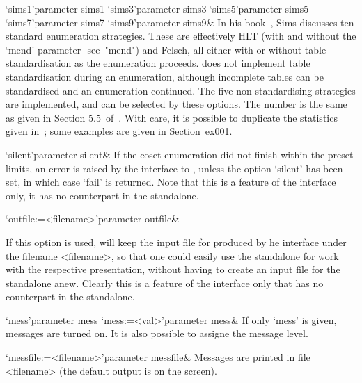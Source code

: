 \>`sims1'{parameter sims1}
\>`sims3'{parameter sims3}
\>`sims5'{parameter sims5}
\>`sims7'{parameter sims7}
\>`sims9'{parameter sims9}&
In  his  book~\cite{Sim},  Sims discusses  ten  standard  enumeration
strategies.  These  are effectively HLT  (with and without  the `mend'
parameter -see~"mend")  and Felsch, all  either with or  without table
standardisation as the enumeration proceeds.
{\ACE} does not implement table standardisation during an enumeration,
although  incomplete tables  can  be standardised  and an  enumeration
continued.
The  five non-standardising  strategies  are implemented,  and can  be
selected by these options.  The number is the same as given in Section
5.5~of~\cite{Sim}.   With  care,  it  is  possible  to  duplicate  the
statistics   given  in~\cite{Sim};  some   examples  are   given  in
Section~{ex001}.





\beginitems

\>`silent'{parameter silent}& If the  coset enumeration did not finish
within  the preset  limits, an  error is  raised by  the  interface to
{\GAP}, unless the option `silent'  has been set, in which case `fail'
is  returned.  Note that  this is  a feature  of the  {\GAP} interface
only, it has no counterpart in the {\ACE} standalone.

\>`outfile:=<filename>'{parameter outfile}&

If this  option is used,  {\GAP} will keep  the input file  for {\ACE}
produced by he {\GAP} interface under the filename <filename>, so that
one  could  easily  use  the  {\ACE}  standalone  for  work  with  the
respective presentation,  without having to  create an input  file for
the standalone anew.  Clearly this is a feature  of the interface only
that has no counterpart in the {\ACE} standalone.

\>`mess'{parameter mess}
\>`mess:=<val>'{parameter mess}&
If only `mess' is given, messages are turned on. It is also possible to
assigne the message level.

\>`messfile:=<filename>'{parameter messfile}&
Messages are printed in file <filename> (the default output is on the
screen).

